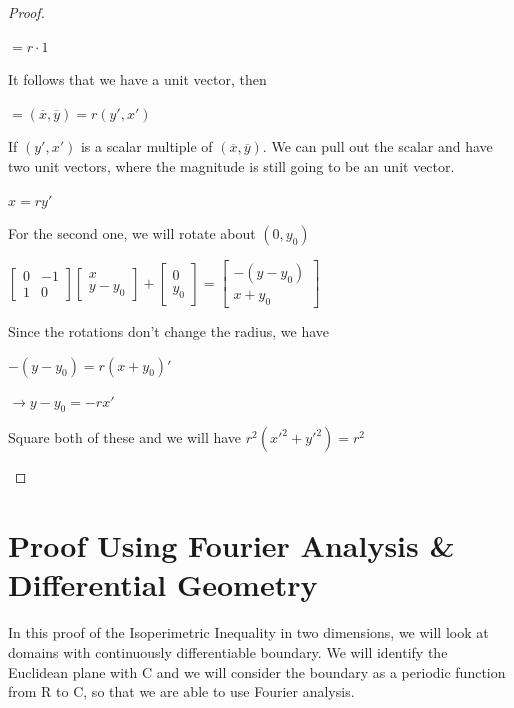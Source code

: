 \documentclass[a4paper]{book}
\numberwithin{theorem}{section}%
\begin{document}
\begin{proof}
\begin{enumerate}
\begin{center}
            $\displaystyle =r\cdot1$
        \end{center}
        It follows that we have a unit vector, then
        \begin{center}
            $\displaystyle =(\overline{x},\overline{y})=r(y',x')$
        \end{center}
        If $(y',x')$ is a scalar multiple of $(\overline{x},\overline{y})$. We can pull out the scalar and have two unit vectors, where the magnitude is still going to be an unit vector.
        \begin{center}
            $\displaystyle x=ry'$
        \end{center}
        For the second one, we will rotate about $(0,y_0)$
        \begin{center}
            $\displaystyle \begin{bmatrix}
                0 & -1\\
                1 & 0
            \end{bmatrix}
            \begin{bmatrix}
                x\\
                y-y_{0}
            \end{bmatrix}+
            \begin{bmatrix}
                0\\
                y_{0}
            \end{bmatrix}=\begin{bmatrix}
                -(y-y_{0})\\
                x+y_{0}
            \end{bmatrix}$
        \end{center}
        Since the rotations don't change the radius, we have
        \begin{center}
            $\displaystyle -(y-y_{0})=r(x+y_{0})'$

            $\displaystyle \longrightarrow y-y_{0}=-rx'$
        \end{center}
        Square both of these and we will have $\displaystyle r^{2}(x'^{2}+y'^{2})=r^{2}$
    \end{enumerate}
\end{proof}

\section{Proof Using Fourier Analysis {\&} Differential Geometry}
In this proof of the Isoperimetric Inequality in two dimensions, we will look at domains
with continuously differentiable boundary. We will identify the Euclidean plane with $\mathrm{C}$
and we will consider the boundary as a periodic function from $\mathrm{R}$ to $\mathrm{C}$, so that we are able
to use Fourier analysis. 
\end{document}
